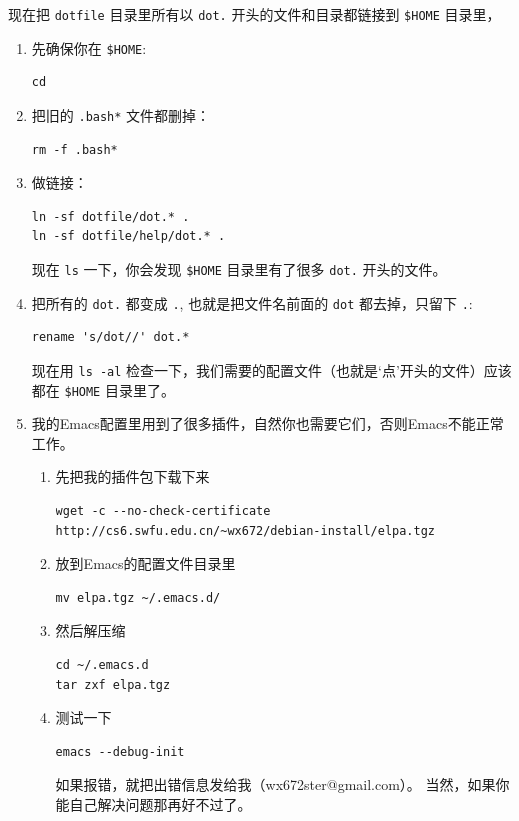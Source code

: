 \documentclass{wx672ctexart} \usepackage{hyperref}
\begin{document}
现在把 \texttt{dotfile} 目录里所有以 \texttt{dot.} 开头的文件和目录都链接到 \texttt{\$HOME} 目录里，
\begin{enumerate}
\item 先确保你在 \texttt{\$HOME}:
\begin{verbatim}
cd
\end{verbatim}

\item 把旧的 \texttt{.bash*} 文件都删掉：
\begin{verbatim}
rm -f .bash*
\end{verbatim}

\item 做链接：
\begin{verbatim}
ln -sf dotfile/dot.* .
ln -sf dotfile/help/dot.* .
\end{verbatim}


现在 \texttt{ls} 一下，你会发现 \texttt{\$HOME} 目录里有了很多 \texttt{dot.} 开头的文件。

\item 把所有的 \texttt{dot.} 都变成 \texttt{.}, 也就是把文件名前面的 \texttt{dot} 都去掉，只留下 \texttt{.}:
\begin{verbatim}
rename 's/dot//' dot.*
\end{verbatim}

现在用 \texttt{ls -al} 检查一下，我们需要的配置文件（也就是‘点’开头的文件）应该都在 \texttt{\$HOME} 目录里了。

\item 我的Emacs配置里用到了很多插件，自然你也需要它们，否则Emacs不能正常工作。
\begin{enumerate}
\item 先把我的插件包下载下来
\begin{verbatim}
wget -c --no-check-certificate http://cs6.swfu.edu.cn/~wx672/debian-install/elpa.tgz
\end{verbatim}
\item 放到Emacs的配置文件目录里
\begin{verbatim}
mv elpa.tgz ~/.emacs.d/
\end{verbatim}
\item 然后解压缩
\begin{verbatim}
cd ~/.emacs.d
tar zxf elpa.tgz
\end{verbatim}
\item 测试一下
\begin{verbatim}
emacs --debug-init
\end{verbatim}
如果报错，就把出错信息发给我（wx672ster@gmail.com）。  
当然，如果你能自己解决问题那再好不过了。
\end{enumerate}
\end{enumerate}
\end{document}
